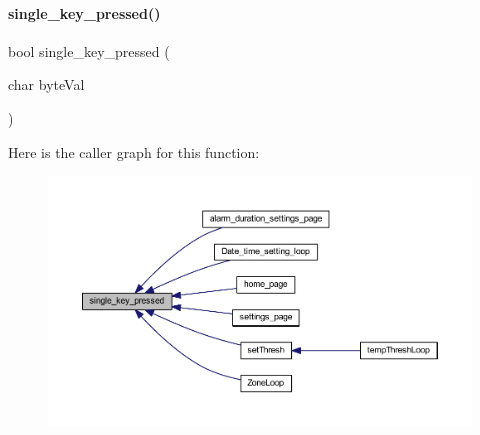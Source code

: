 \paragraph{single\+\_\+key\+\_\+pressed()}
{\footnotesize\ttfamily bool single\+\_\+key\+\_\+pressed (\begin{DoxyParamCaption}\item[{char}]{byte\+Val }\end{DoxyParamCaption})}

Here is the caller graph for this function\+:
\nopagebreak
\begin{figure}[H]
\begin{center}
\leavevmode
\includegraphics[width=350pt]{a00020_a8ac785f2d4c8d133c61c4e9be06cb606_icgraph}
\end{center}
\end{figure}
